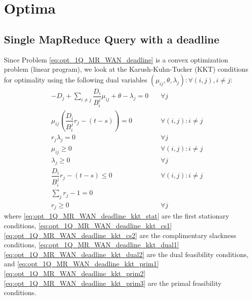 \section{Optima}
\label{sec:optima}

\subsection{Single MapReduce Query with a deadline}

Since Problem \eqref{eq:opt_1Q_MR_WAN_deadline} is a convex optimization problem (linear program), we look at the Karush-Kuhn-Tucker (KKT) conditions for optimality using the following dual variables $(\mu_{ij},\theta,\lambda_j):\forall (i,j),i\neq j$:
\begin{subequations}\label{eq:opt_1Q_MR_WAN_deadline_kkt}
	\begin{align}
		-D_j+\sum_{i\neq j}\dfrac{D_i}{B_i^j}\mu_{ij} + \theta - \lambda_j = 0 & \quad \forall j \label{eq:opt_1Q_MR_WAN_deadline_kkt_stat}\\
		\mu_{ij}\left(\dfrac{D_{i}}{B_{i}^{j}}r_{j} - (t - s)\right) = 0 & \quad \forall (i,j):i\neq j \label{eq:opt_1Q_MR_WAN_deadline_kkt_cs1}\\
		r_j\lambda_j = 0 & \quad \forall j \label{eq:opt_1Q_MR_WAN_deadline_kkt_cs2}\\
		\mu_{ij} \geq 0 & \quad \forall (i,j):i\neq j \label{eq:opt_1Q_MR_WAN_deadline_kkt_dual1}\\
		\lambda_j \geq 0  & \quad \forall j \label{eq:opt_1Q_MR_WAN_deadline_kkt_dual2}\\
		\dfrac{D_{i}}{B_{i}^{j}}r_{j} - (t - s) \leq 0  & \quad \forall (i,j):i\neq j \label{eq:opt_1Q_MR_WAN_deadline_kkt_prim1}\\
		\sum_{j}r_{j} - 1 = 0 & \label{eq:opt_1Q_MR_WAN_deadline_kkt_prim2}\\
		r_{j} \geq 0 & \quad \forall j \label{eq:opt_1Q_MR_WAN_deadline_kkt_prim3}
	\end{align}
\end{subequations}
where \eqref{eq:opt_1Q_MR_WAN_deadline_kkt_stat} are the first stationary conditions, \eqref{eq:opt_1Q_MR_WAN_deadline_kkt_cs1} \eqref{eq:opt_1Q_MR_WAN_deadline_kkt_cs2} are the complimentary slackness conditions, \eqref{eq:opt_1Q_MR_WAN_deadline_kkt_dual1} \eqref{eq:opt_1Q_MR_WAN_deadline_kkt_dual2} are the dual feasibility conditions, and \eqref{eq:opt_1Q_MR_WAN_deadline_kkt_prim1} \eqref{eq:opt_1Q_MR_WAN_deadline_kkt_prim2} \eqref{eq:opt_1Q_MR_WAN_deadline_kkt_prim3} are the primal feasibility conditions.

